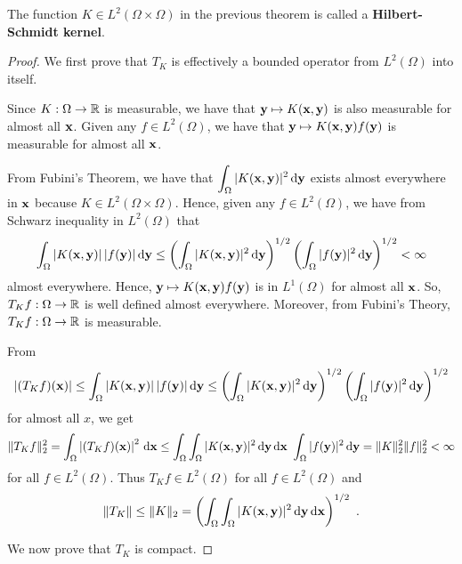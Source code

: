The function $\displaystyle K \in L^2(\Omega\times \Omega)$ in the
previous theorem is called a
{\bfseries Hilbert-Schmidt kernel}. 

\begin{proof}
 We first prove that $T_K$ is effectively a bounded operator
from $\displaystyle L^2(\Omega)$ into itself.

Since $K:\Omega \time \Omega \to \RR$ is measurable, we have that
$\mathbf{y} \mapsto K(\mathbf{x},\mathbf{y})$ is also measurable for almost all
$\mathbf{x}$.  Given any $\displaystyle f\in L^2(\Omega)$, we have that
$\mathbf{y} \mapsto K(\mathbf{x},\mathbf{y})f(\mathbf{y})$ is
measurable for almost all $\mathbf{x}$.

From Fubini's Theorem, we have that
$\displaystyle \int_{\Omega} |K(\mathbf{x},\mathbf{y})|^2\,\mathrm{d}{\mathbf{y}}$
exists almost everywhere in $\mathbf{x}$ because
$\displaystyle K \in L^2(\Omega\times \Omega)$.  Hence, given any
$\displaystyle f \in L^2(\Omega)$, we have from Schwarz inequality in
$\displaystyle L^2(\Omega)$ that
\[
\int_{\Omega} |K(\mathbf{x},\mathbf{y})|\,|f(\mathbf{y})| \,\mathrm{d}{\mathbf{y}}
\leq \left(\int_{\Omega} |K(\mathbf{x},\mathbf{y})|^2\,\mathrm{d}{\mathbf{y}}\right)^{1/2}
\left(\int_{\Omega} |f(\mathbf{y})|^2\,\mathrm{d}{\mathbf{y}}\right)^{1/2} < \infty
\]
almost everywhere.  Hence,
$\mathbf{y} \mapsto K(\mathbf{x},\mathbf{y})f(\mathbf{y})$ is in
$\displaystyle L^1(\Omega)$
for almost all $\mathbf{x}$.  So, $T_K f:\Omega \to \mathbb{R}$ is well defined
almost everywhere.  Moreover, from Fubini's Theory,
$T_K f:\Omega \to \mathbb{R}$ is measurable. 

From
\[
\left| (T_K f)(\mathbf{x}) \right|
\leq \int_{\Omega} |K(\mathbf{x},\mathbf{y})|\,|f(\mathbf{y})| \,\mathrm{d}{\mathbf{y}}
\leq \left(\int_{\Omega} |K(\mathbf{x},\mathbf{y})|^2\,\mathrm{d}{\mathbf{y}}\right)^{1/2}
\left(\int_{\Omega} |f(\mathbf{y})|^2\,\mathrm{d}{\mathbf{y}}\right)^{1/2}
\]
for almost all $x$, we get
\[
\| T_K f \|_2^2 =
\int_{\Omega} \left| (T_K f)(\mathbf{x}) \right|^2 \,\mathrm{d}{\mathbf{x}}
\leq \int_{\Omega}\int_{\Omega} |K(\mathbf{x},\mathbf{y})|^2\,\mathrm{d}{\mathbf{y}}\,\mathrm{d}{\mathbf{x}}
\ \int_{\Omega} |f(\mathbf{y})|^2\,\mathrm{d}{\mathbf{y}}
= \| K \|_2^2 \|f\|_2^2 < \infty
\]
for all $\displaystyle f\in L^2(\Omega)$.  Thus
$\displaystyle T_K f \in L^2(\Omega)$ for all
$\displaystyle f\in L^2(\Omega)$ and
\begin{equation} \label{faHilbSchA}
\|T_K \| \leq \|K\|_2
= \left( \int_{\Omega}\int_{\Omega}
|K(\VEC{x},\VEC{y})|^2\dx{\VEC{y}}\dx{\VEC{x}} \right)^{1/2} \ .
\end{equation}

 We now prove that $T_K$ is compact.


\end{proof}
